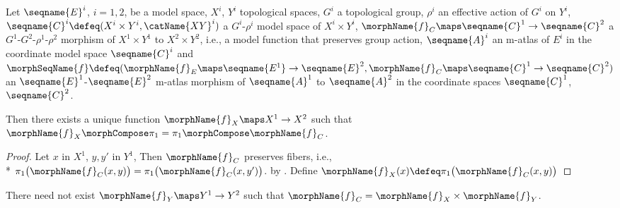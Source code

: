 \documentclass{article}
\begin{document}
\begin{lemma}
\label{lem:Bun-Atlbasemorph}
Let $\seqname{E}^i$, $i=1,2$, be a model space, $X^i$, $Y^i$ topological
spaces, $G^i$ a topological group, $\rho^i$ an effective action of $G^i$
on $Y^i$, $\seqname{C}^i \defeq (X^i \times Y^i, \catName{XY}^i)$ a
$G^i$-$\rho^i$ model space of $X^i \times Y^i$,
$\morphName{f}_C \maps \seqname{C}^1 \to \seqname{C}^2$ a
$G^1$-$G^2$-$\rho^1$-$\rho^2$ morphism of
$X^1 \times Y^1$ to $X^2 \times Y^2$, i.e., a model function that
preserves group action, $\seqname{A}^i$ an m-atlas of $E^i$ in the
coordinate model space $\seqname{C}^i$ and
$
  \morphSeqName{f} \defeq
  (
    \morphName{f}_E \maps \seqname{E^1} \to \seqname{E}^2,
    \morphName{f}_C \maps \seqname{C}^1 \to \seqname{C}^2
  )
$
an $\seqname{E}^1$-$\seqname{E}^2$ m-atlas morphism of $\seqname{A}^1$
to $\seqname{A}^2$ in the coordinate spaces $\seqname{C}^1$,
$\seqname{C}^2$.

Then there exists a unique function $\morphName{f}_X \maps X^1 \to X^2$
such that $\morphName{f}_X \morphCompose \pi_1 = \pi_1 \morphCompose \morphName{f}_C$.

\begin{proof}
Let $x$ in $X^1$, $y,y'$ in $Y^1$, Then
$\morphName{f}_C$ preserves fibers, i.e., \\*
$
\pi_1 \bigl ( \morphName{f}_C(x,y) \bigr ) =
\pi_1 \bigl ( \morphName{f}_C(x,y') \bigr )
$.
by . Define
$\morphName{f}_X(x) \defeq \pi_1 \bigl ( \morphName{f}_C(x,y) \bigr )$
\end{proof}

\begin{remark}
There need not exist $\morphName{f}_Y \maps Y^1 \to Y^2$ such that
$\morphName{f}_C = \morphName{f}_X \times \morphName{f}_Y$.
\end{remark}
\end{lemma}
\end{document}
